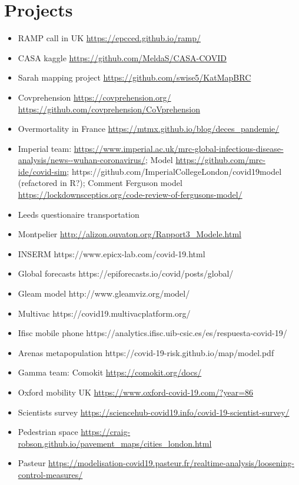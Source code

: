 \documentclass[10pt]{article}
\begin{document}
\section{Projects}

\begin{itemize}
	\item RAMP call in UK \url{https://epcced.github.io/ramp/}
	\item CASA kaggle \url{https://github.com/MeldaS/CASA-COVID}
	\item Sarah mapping project \url{https://github.com/swise5/KatMapBRC}
	\item Covprehension \url{https://covprehension.org/} \url{https://github.com/covprehension/CoVprehension}
	\item Overmortality in France \url{https://mtmx.github.io/blog/deces_pandemie/}
	\item Imperial team: \url{https://www.imperial.ac.uk/mrc-global-infectious-disease-analysis/news--wuhan-coronavirus/}; Model \url{https://github.com/mrc-ide/covid-sim}; https://github.com/ImperialCollegeLondon/covid19model (refactored in R?); Comment Ferguson model \url{https://lockdownsceptics.org/code-review-of-fergusons-model/}
	\item Leeds questionaire transportation %
	\item Montpelier \url{http://alizon.ouvaton.org/Rapport3_Modele.html}
	\item INSERM https://www.epicx-lab.com/covid-19.html
	\item Global forecasts https://epiforecasts.io/covid/posts/global/
	\item Gleam model http://www.gleamviz.org/model/
	\item Multivac https://covid19.multivacplatform.org/
	\item Ifisc mobile phone https://analytics.ifisc.uib-csic.es/es/respuesta-covid-19/
	\item Arenas metapopulation https://covid-19-risk.github.io/map/model.pdf
	\item Gamma team: Comokit \url{https://comokit.org/docs/}
	\item Oxford mobility UK \url{https://www.oxford-covid-19.com/?year=86}
	\item Scientists survey \url{https://sciencehub-covid19.info/covid-19-scientist-survey/}
	\item Pedestrian space \url{https://craig-robson.github.io/pavement_maps/cities_london.html}
	\item Pasteur \url{https://modelisation-covid19.pasteur.fr/realtime-analysis/loosening-control-measures/}
\end{itemize}
\end{document}
